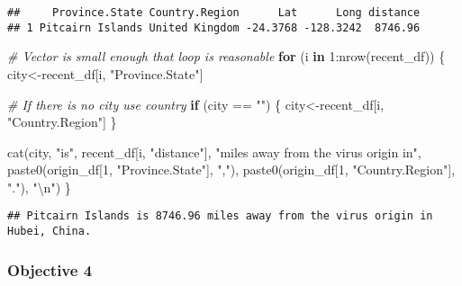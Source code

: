 \documentclass[
]{article}
\newenvironment{Shaded}{\begin{snugshade}}{\end{snugshade}}
\newcommand{\CommentTok}[1]{\textcolor[rgb]{0.56,0.35,0.01}{\textit{#1}}}
\newcommand{\ControlFlowTok}[1]{\textcolor[rgb]{0.13,0.29,0.53}{\textbf{#1}}}
\newcommand{\DecValTok}[1]{\textcolor[rgb]{0.00,0.00,0.81}{#1}}
\newcommand{\FunctionTok}[1]{\textcolor[rgb]{0.00,0.00,0.00}{#1}}
\newcommand{\NormalTok}[1]{#1}
\newcommand{\OtherTok}[1]{\textcolor[rgb]{0.56,0.35,0.01}{#1}}
\newcommand{\SpecialCharTok}[1]{\textcolor[rgb]{0.00,0.00,0.00}{#1}}
\newcommand{\StringTok}[1]{\textcolor[rgb]{0.31,0.60,0.02}{#1}}
\begin{document}
\begin{verbatim}
##     Province.State Country.Region      Lat      Long distance
## 1 Pitcairn Islands United Kingdom -24.3768 -128.3242  8746.96
\end{verbatim}

\begin{Shaded}
\begin{Highlighting}[]
\CommentTok{\# Vector is small enough that loop is reasonable}
\ControlFlowTok{for}\NormalTok{ (i }\ControlFlowTok{in} \DecValTok{1}\SpecialCharTok{:}\FunctionTok{nrow}\NormalTok{(recent\_df)) \{}
\NormalTok{  city}\OtherTok{\textless{}{-}}\NormalTok{recent\_df[i, }\StringTok{"Province.State"}\NormalTok{]}
  
  \CommentTok{\# If there is no city use country}
  \ControlFlowTok{if}\NormalTok{ (city }\SpecialCharTok{==} \StringTok{""}\NormalTok{) \{}
\NormalTok{    city}\OtherTok{\textless{}{-}}\NormalTok{recent\_df[i, }\StringTok{"Country.Region"}\NormalTok{]}
\NormalTok{  \}}
  
  \FunctionTok{cat}\NormalTok{(city, }\StringTok{"is"}\NormalTok{, recent\_df[i, }\StringTok{"distance"}\NormalTok{], }
      \StringTok{"miles away from the virus origin in"}\NormalTok{, }
      \FunctionTok{paste0}\NormalTok{(origin\_df[}\DecValTok{1}\NormalTok{, }\StringTok{"Province.State"}\NormalTok{], }\StringTok{","}\NormalTok{), }
      \FunctionTok{paste0}\NormalTok{(origin\_df[}\DecValTok{1}\NormalTok{, }\StringTok{"Country.Region"}\NormalTok{], }\StringTok{"."}\NormalTok{), }\StringTok{"}\SpecialCharTok{\textbackslash{}n}\StringTok{"}\NormalTok{)}
\NormalTok{\}}
\end{Highlighting}
\end{Shaded}

\begin{verbatim}
## Pitcairn Islands is 8746.96 miles away from the virus origin in Hubei, China.
\end{verbatim}

\hypertarget{objective-4}{%
\subsubsection{Objective 4}\label{objective-4}}
\end{document}
